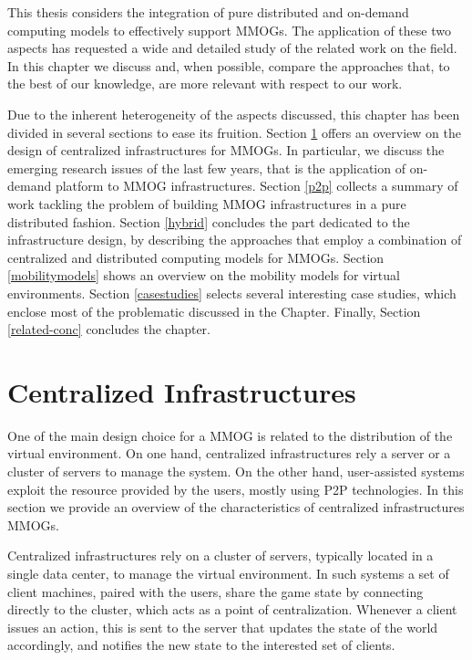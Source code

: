 \documentclass[final,10pt,a5paper]{phdimt}
\theoremstyle{definition}
\begin{document}
This thesis considers the integration of pure distributed and on-demand computing models to effectively support MMOGs.
The application of these two aspects has requested a wide and detailed study of the related work on the field.
In this chapter we discuss and, when possible, compare the approaches that, to the best of our knowledge, are more relevant with respect to our work. 

Due to the inherent heterogeneity of the aspects discussed, this chapter has been divided in several sections to ease its fruition.
Section \ref{centralized} offers an overview on the design of centralized infrastructures for MMOGs. In particular, we discuss the emerging research issues of the last few years, that is the application of on-demand platform to MMOG infrastructures.
Section \ref{p2p} collects a summary of work tackling the problem of building MMOG infrastructures in a pure distributed fashion.
Section \ref{hybrid} concludes the part dedicated to the infrastructure design, by describing the approaches that employ a combination of centralized and distributed computing models for MMOGs. 
Section \ref{mobilitymodels} shows an overview on the mobility models for virtual environments.
Section \ref{casestudies} selects several interesting case studies, which enclose most of the problematic discussed in the Chapter.
Finally, Section \ref{related-conc} concludes the chapter.



\section{Centralized Infrastructures}
\label{centralized}


One of the main design choice for a MMOG is related to the distribution of the virtual environment.
On one hand, centralized infrastructures rely a server or a cluster of servers to manage the system.
On the other hand, user-assisted systems exploit the resource provided by the users, mostly using P2P technologies. In this section we provide an overview of the characteristics of centralized infrastructures MMOGs.




Centralized infrastructures rely on a cluster of servers, typically located in a single data center, to manage the virtual environment.
In such systems a set of client machines, paired with the users, share the game state by connecting directly to the cluster, which acts as a point of centralization. Whenever a client issues an action, this is sent to the server that updates the state of the world accordingly, and notifies the new state to the interested set of clients.
\end{document}
